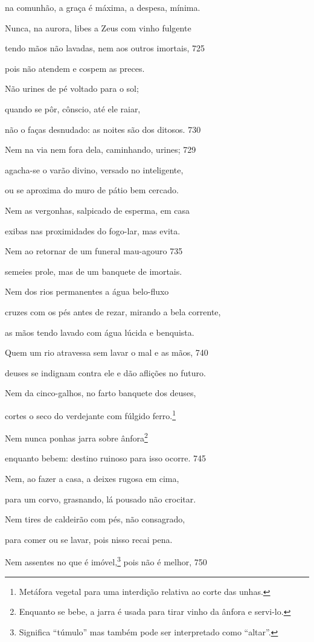 na comunhão, a graça é máxima, a despesa, mínima.

Nunca, na aurora, libes a Zeus com vinho fulgente

tendo mãos não lavadas, nem aos outros imortais, \num{725}

pois não atendem e cospem as preces.

Não urines de pé voltado para o sol;

quando se pôr, cônscio, até ele raiar,

não o faças desnudado: as noites são dos ditosos. \num{730}

Nem na via nem fora dela, caminhando, urines; \num{729}

agacha-se o varão divino, versado no inteligente,

ou se aproxima do muro de pátio bem cercado.

Nem as vergonhas, salpicado de esperma, em casa

exibas nas proximidades do fogo-lar, mas evita.

Nem ao retornar de um funeral mau-agouro \num{735}

semeies prole, mas de um banquete de imortais.

Nem dos rios permanentes a água belo-fluxo

cruzes com os pés antes de rezar, mirando a bela corrente,

as mãos tendo lavado com água lúcida e benquista.

Quem um rio atravessa sem lavar o mal e as mãos, \num{740}

deuses se indignam contra ele e dão aflições no futuro.

Nem da cinco-galhos, no farto banquete dos deuses,

cortes o seco do verdejante com fúlgido ferro.\footnote{Metáfora vegetal para uma interdição relativa ao corte das unhas.}

Nem nunca ponhas jarra sobre ânfora\footnote{Enquanto se bebe, a jarra é usada para tirar vinho da ânfora e servi-lo.}

enquanto bebem: destino ruinoso para isso ocorre. \num{745}

Nem, ao fazer a casa, a deixes rugosa em cima,

para um corvo, grasnando, lá pousado não crocitar.

Nem tires de caldeirão com pés, não consagrado,

para comer ou se lavar, pois nisso recai pena.

Nem assentes no que é imóvel,\footnote{Significa ``túmulo'' mas também pode ser interpretado como ``altar''.} pois não é melhor, \num{750}

